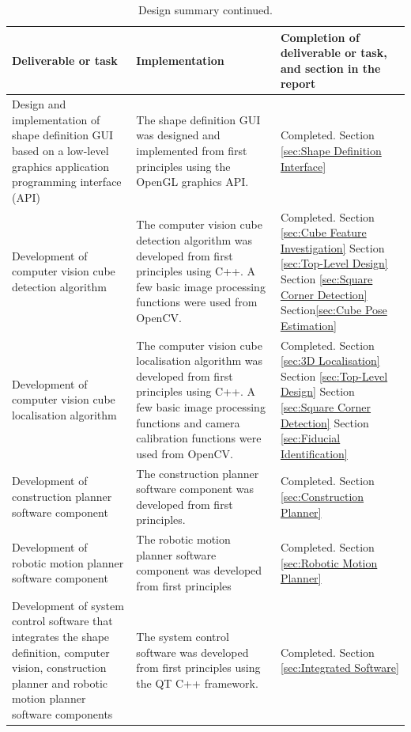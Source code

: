 \begin{table}[H]
	\renewcommand{\arraystretch}{1.3}
	\centering
	\begin{tabular}{|>{\raggedright}m{4.6cm}|>{\raggedright}m{6.6cm}|>{\raggedright\arraybackslash}m{3cm}|}
		\hline
		\textbf{Deliverable or task} & \textbf{Implementation} & \textbf{Completion of deliverable or task, and section in the report} \\
		\hline
		Design and implementation of shape definition GUI based on a low-level graphics application programming interface (API) & The shape definition GUI was designed and implemented from first principles using the OpenGL graphics API. & Completed. Section \ref{sec:Shape Definition Interface} \\
		\hline
		Development of computer vision cube detection algorithm & The computer vision cube detection algorithm was developed from first principles using C++. A few basic image processing functions were used from OpenCV. & Completed. Section \ref{sec:Cube Feature Investigation} Section \ref{sec:Top-Level Design} Section \ref{sec:Square Corner Detection} Section\ref{sec:Cube Pose Estimation}  \\
		\hline
		Development of computer vision cube localisation algorithm & The computer vision cube localisation algorithm was developed from first principles using C++. A few basic image processing functions and camera calibration functions were used from OpenCV. & Completed. Section \ref{sec:3D Localisation} Section \ref{sec:Top-Level Design}  Section \ref{sec:Square Corner Detection} Section \ref{sec:Fiducial Identification} \\
		\hline
		Development of construction planner software component & The construction planner software component was developed from first principles. & Completed. Section \ref{sec:Construction Planner} \\
		\hline
		Development of robotic motion planner software component & The robotic motion planner software component was developed from first principles & Completed. Section \ref{sec:Robotic Motion Planner} \\
		\hline
		Development of system control software that integrates the shape definition, computer vision, construction planner and robotic motion planner software components & The system control software was developed from first principles using the QT C++ framework. & Completed. Section \ref{sec:Integrated Software} \\
		\hline
	\end{tabular}
	\caption{\label{tab:design_summary_p2}Design summary continued.}
\end{table}

